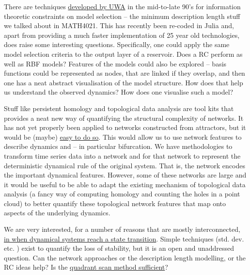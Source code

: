 \documentclass[10pt,a4paper]{Projects}
\begin{document}
There are techniques \href{https://research-repository.uwa.edu.au/en/publications/minimum-description-length-neural-networks-for-time-series-predic}{developed by UWA} in the mid-to-late 90's for information theoretic constraints on model selection – the minimum description length stuff we talked about in MATH4021. This has recently been re-coded in Julia and, apart from providing a much faster implementation of 25 year old technologies, does raise some interesting questions. Specifically, one could apply the same model selection criteria to the output layer of a reservoir. Does a RC perform as well as RBF models? Features of the models could also be explored – basis functions could be represented as nodes, that are linked if they overlap, and then one has a neat abstract visualisation of the model structure. How does that help us understand the observed dynamics? How does one visualise such a model? 

Stuff like persistent homology and topological data analysis are tool kits that provides a neat new way of quantifying the structural complexity of networks. It has not yet properly been applied to networks constructed from attractors, but it would be (maybe) \href{https://academic.oup.com/nsr/article/6/6/1064/5499323}{easy to do so}. This would allow us to use network features to describe dynamics and – in particular bifurcation. We have methodologies to transform time series data into a network and for that network to represent the deterministic dynamical rule of the original system. That is, the network encodes the important dynamical features. However, some of these networks are large and it would be useful to be able to adapt the existing mechanism of topological data analysis (a fancy way of computing homology and counting the holes in a point cloud) to better quantify these topological network features that map onto aspects of the underlying dynamics.

We are very interested, for  a number of reasons that are mostly interconnected, \href{https://research-repository.uwa.edu.au/en/publications/detecting-and-predicting-tipping-points}{in when dynamical systems reach a state transition}. Simple techniques (std. dev. etc. ) exist to quantify the loss of stability, but it is an open and unaddressed question. Can the  network approaches or the description length modelling, or the RC ideas help? Is the \href{https://research-repository.uwa.edu.au/en/publications/quadrant-scan-for-multi-scale-transition-detection}{quadrant scan method sufficient}? 
\end{document}
